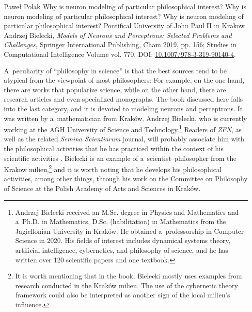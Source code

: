 \begin{newrevengenv}{Paweł Polak}
	{Why is neuron modeling of particular philosophical interest?}
	{Why is neuron modeling of particular philosophical interest?}
	{Why is neuron modeling of particular philosophical interest?}
	{Pontifical University of John Paul II in Krakow}
	{Andrzej Bielecki, \textit{Models of Neurons and Perceptrons: Selected Problems and Challenges}, Springer International Publishing, Cham 2019, pp. 156; Studies in Computational Intelligence Volume vol. 770, DOI: \href{https://doi.org/10.1007/978-3-319-90140-4}{10.1007/978-3-319-90140-4}.}
	
	
	
%



A~peculiarity of ``philosophy in science''
\parencites[see][]{heller_how_2019}[][]{polak_philosophy_2019} %
 is that the best sources tend to be atypical from the viewpoint of most philosophers: For example, on the one hand, there are works that popularize science, while on the other hand, there are research articles and even specialized monographs. The book discussed here falls into the last category, and it is devoted to modeling neurons and perceptrons. It was written by a~mathematician from Kraków, Andrzej Bielecki, who is currently working at the AGH University of Science and Technology.\footnote{Andrzej Bielecki received an M.Sc. degree in Physics and Mathematics and a~Ph.D. in Mathematics, D.Sc. (habilitation) in Mathematics from the Jagiellonian University in Kraków. He obtained a~professorship in Computer Science in 2020. His fields of interest includes dynamical systems theory, artificial intelligence, cybernetics, and philosophy of science, and he has written over 120 scientific papers and one textbook.} Readers of \textit{ZFN}, as well as the related \textit{Semina Scientiarum} journal, will probably associate him with the philosophical activities that he has practiced within the context of his scientific activities 
\parencites*[][]{bielecki_cybernetyczna_2016}[][]{bielecki_epistemologiczne_2018}. %
 Bielecki is an example of a~scientist–philosopher from the Krakow milieu,\footnote{It is worth mentioning that in the book, Bielecki mostly uses examples from research conducted in the Kraków milieu. The use of the cybernetic theory framework could also be interpreted as another sign of the local milieu's influence.} and it is worth noting that he develops his philosophical activities, among other things, through his work on the Committee on Philosophy of Science at the Polish Academy of Arts and Sciences in Kraków.


\end{newrevengenv}
